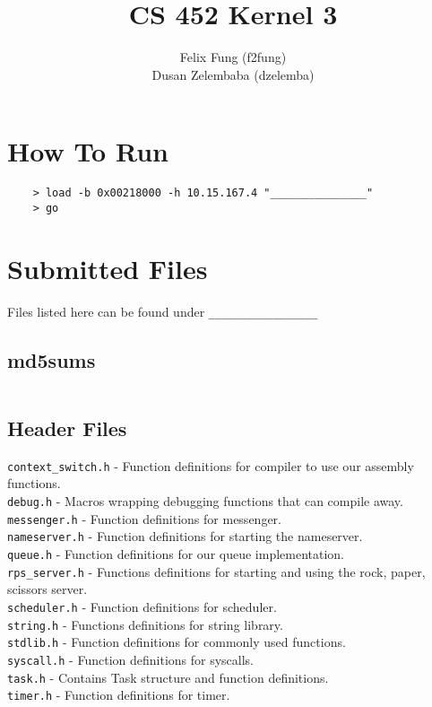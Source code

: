 \documentclass[letterpaper]{article}
\begin{document}
\title{CS 452 Kernel 3}
\author{Felix Fung (f2fung) \\ Dusan Zelembaba (dzelemba)}
\maketitle

\section{How To Run}
\begin{verbatim}
	> load -b 0x00218000 -h 10.15.167.4 "_______________"
	> go
\end{verbatim}

\section{Submitted Files}

Files listed here can be found under \verb!_________________!

\subsection{md5sums}
\begin{verbatim}

\end{verbatim}

\subsection{Header Files}
\verb!context_switch.h! - Function definitions for compiler to use our assembly functions.\\
\verb!debug.h! - Macros wrapping debugging functions that can compile away.\\
\verb!messenger.h! - Function definitions for messenger.\\
\verb!nameserver.h! - Function definitions for starting the nameserver.\\
\verb!queue.h! - Function definitions for our queue implementation.\\
\verb!rps_server.h! - Functions definitions for starting and using the rock, paper, scissors server. \\
\verb!scheduler.h! - Function definitions for scheduler.\\
\verb!string.h! - Functions definitions for string library.\\
\verb!stdlib.h! - Function definitions for commonly used functions.\\
\verb!syscall.h! - Function definitions for syscalls.\\
\verb!task.h! - Contains Task structure and function definitions.\\
\verb!timer.h! - Function definitions for timer.\\
\end{document}
